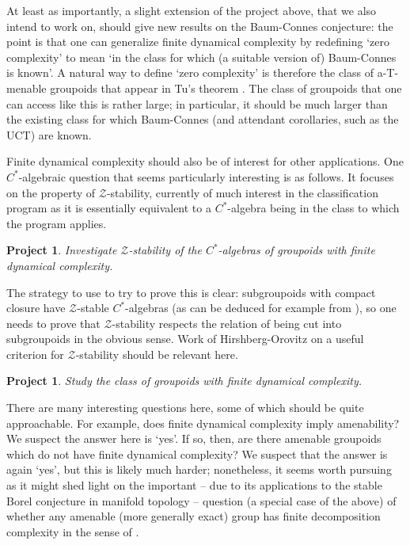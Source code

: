 \documentclass[11pt]{article}
\theoremstyle{plain}
\newtheorem{project}[theorem]{Project}
\theoremstyle{definition}
\theoremstyle{remark}
\begin{document}
At least as importantly, a slight extension of the project above, that we also intend to work on, should give new results on the Baum-Connes conjecture: the point is that one can generalize finite dynamical complexity by redefining `zero complexity' to mean `in the class for which (a suitable version of) Baum-Connes is known'.  A natural way to define `zero complexity' is therefore the class of a-T-menable groupoids that appear in Tu's theorem \cite{Tu:1999bq}.  The class of groupoids that one can access like this is rather large; in particular, it should be much larger than the existing class for which Baum-Connes (and attendant corollaries, such as the UCT) are known.

Finite dynamical complexity should also be of interest for other applications.  One $C^*$-algebraic question that seems particularly interesting is as follows.  It focuses on the property of $\mathcal{Z}$-stability, currently of much interest in the classification program as it is essentially equivalent to a $C^*$-algebra being in the class to which the program applies.

\begin{project}\label{z stable proj}
Investigate $\mathcal{Z}$-stability of the $C^*$-algebras of groupoids with finite dynamical complexity.
\end{project}

The strategy to use to try to prove this is clear: subgroupoids with compact closure have $\mathcal{Z}$-stable $C^*$-algebras (as can be deduced for example from \cite{Winter:2004rb}), so one needs to prove that $\mathcal{Z}$-stability respects the relation of being cut into subgroupoids in the obvious sense.  Work of Hirshberg-Orovitz \cite{Hirshberg:2013aa} on a useful criterion for $\mathcal{Z}$-stability should be relevant here.


\begin{project}
Study the class of groupoids with finite dynamical complexity.
\end{project}

There are many interesting questions here, some of which should be quite approachable.  For example, does finite dynamical complexity imply amenability?  We suspect the answer here is `yes'.  If so, then, are there amenable groupoids which do not have finite dynamical complexity?  We suspect that the answer is again `yes', but this is likely much harder; nonetheless, it seems worth pursuing as it might shed light on the important -- due to its applications to the stable Borel conjecture in manifold topology -- question (a special case of the above) of whether any amenable (more generally exact) group has finite decomposition complexity in the sense of \cite{Guentner:2013aa}.
\end{document}
